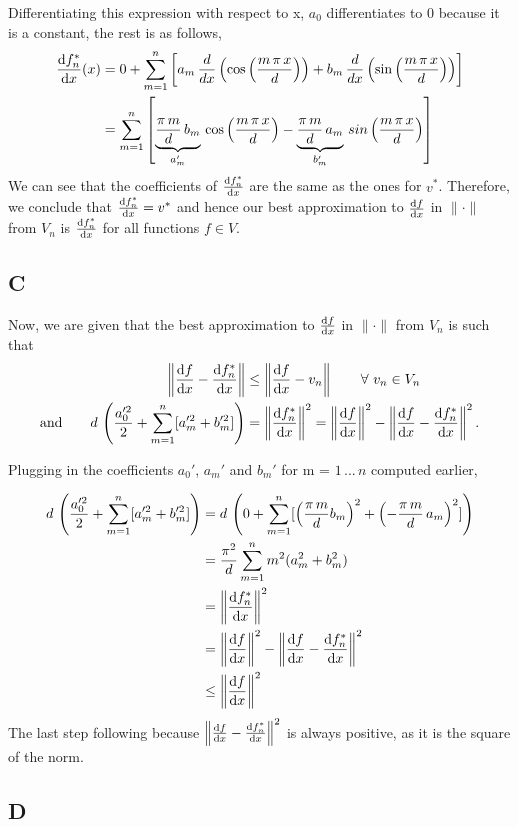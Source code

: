 \documentclass[12pt]{article}
\newcommand{\dbydx}[1]{\frac{d}{dx}\left( #1 \right)}
\newcommand{\dfdx}{\frac{{\rm d}f}{{\rm d}x}}
\newcommand{\dfstardx}{\frac{{\rm d}f_n^*}{{\rm d}x}}
\newcommand{\norm}[1]{\left\|#1\right\|}
\begin{document}
Differentiating this expression with respect to x, $a_0$ differentiates to 0 because it is a constant, the rest is as follows,
\begin{align}
\dfstardx(x) 
	&= 0 + \sum_{m=1}^n \left[ a_m \,\dbydx{\cos \left(\frac{m\,\pi\,x}{d} \right)} +
				b_m\,\dbydx{\sin \left(\frac{m\,\pi\,x}{d}\right)}\right]
	\\ &= \sum_{m=1}^n \left[ \underbrace{\frac{\pi\,m}{d}\,b_m}_{a_m'}\,\cos \left(\frac{m\,\pi\,x}{d}\right) -
						\underbrace{\frac{\pi\,m}{d}\,a_m}_{b_m'} \,sin \left(\frac{m\,\pi\,x}{d} \right) \right]
\end{align}
We can see that the coefficients of $\dfstardx$ are the same as the ones for $v^*$. Therefore, we conclude
that $\dfstardx = v^*$ and hence our best approximation to $\dfdx$ in $\|\cdot\|$ from $V_n$ is $\dfstardx$
for all functions $f \in V$.

\subsection{C}
Now, we are given that the best approximation to $\dfdx$ in $\|\cdot\|$ from $V_n$ is such that
\begin{align*}
\norm{\dfdx-\dfstardx} &\leq \norm{\dfdx-v_n} \qquad \forall \ v_n \in V_n \\
\mbox{and} \qquad  d\,\left(\frac{a_0'^2}{2} + \sum_{m=1}^n [a_m'^2 + b_m'^2]
\right)
& = \norm{\dfstardx}^2 = \norm{\dfdx}^2 - \norm{\dfdx-\dfstardx}^2. 
\end{align*}

Plugging in the coefficients $a_0'$, $a_m'$ and $b_m'$ for m = $1\,...\,n$ computed earlier,

\begin{align}
	d\,\left(\frac{a_0'^2}{2} + \sum_{m=1}^n [a_m'^2 + b_m'^2] \right) &=
	d\,\left(0 + \sum_{m=1}^n [\left(\frac{\pi\,m}{d}b_m\right)^2 +
							   \left(- \frac{\pi\,m}{d}\,a_m\right)^2]\right)\\
	&= \frac{\pi^2}{d} \sum_{m=1}^n m^2 (a_m^2 + b_m^2)\\
	&= \norm{\dfstardx}^2\\
	&= \norm{\dfdx}^2 - \norm{\dfdx-\dfstardx}^2\\
	&\leq \norm{\dfdx}^2
\end{align}
The last step following because  $\norm{\dfdx-\dfstardx}^2$ is always positive, as it is the square of
the norm.
\subsection{D}
\end{document}
